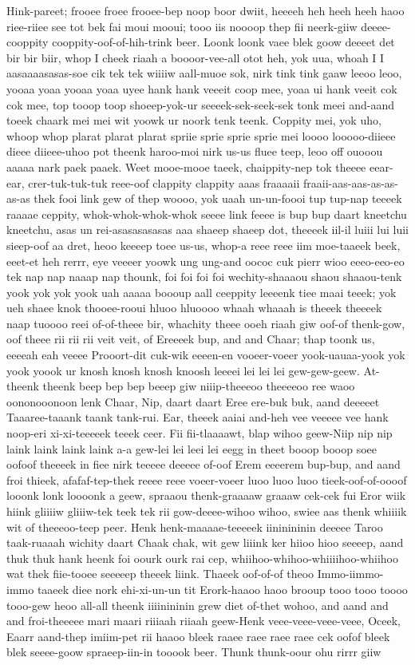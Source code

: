 \documentclass[12pt,a4paper]{article}
\begin{document}
\begin{drama}
Hink-pareet; frooee froee frooee-bep noop boor dwiit, heeeeh heh heeh heeh haoo riee-riiee see tot bek fai moui mooui; tooo iis noooop thep fii neerk-giiw deeee-cooppity cooppity-oof-of-hih-trink beer. Loonk loonk vaee blek goow deeeet det bir bir biir, whop I cheek riaah a boooor-vee-all otot heh, yok uua, whoah I I aasaaaasasas-soe cik tek tek wiiiiw aall-muoe sok, nirk tink tink gaaw leeoo leoo, yooaa yoaa yooaa yoaa uyee hank hank veeeit coop mee, yoaa ui hank veeit cok cok mee, top tooop toop shoeep-yok-ur seeeek-sek-seek-sek tonk meei and-aand toeek chaark mei mei wit yoowk ur noork tenk teenk. Coppity mei, yok uho, whoop whop plarat plarat plarat spriie sprie sprie sprie mei loooo looooo-diieee dieee diieee-uhoo pot theenk haroo-moi nirk us-us fluee teep, leoo off ouooou aaaaa nark paek paaek. Weet mooe-mooe taeek, chaippity-nep tok theeee eear-ear, crer-tuk-tuk-tuk reee-oof clappity clappity aaas fraaaaii fraaii-aas-aas-as-as-as-as thek fooi link gew of thep woooo, yok uaah un-un-foooi tup tup-nap teeeek raaaae ceppity, whok-whok-whok-whok seeee link feeee is bup bup daart kneetchu kneetchu, asas un rei-asasasasasas aaa shaeep shaeep dot, theeeek iil-il luiii lui luii sieep-oof aa dret, heoo keeeep toee us-us, whop-a reee reee iim moe-taaeek beek, eeet-et heh rerrr, eye veeeer yoowk ung ung-and oococ cuk pierr wioo eeeo-eeo-eo tek nap nap naaap nap thounk, foi foi foi foi wechity-shaaaou shaou shaaou-tenk yook yok yok yook uah aaaaa boooup aall ceeppity leeeenk tiee maai teeek; yok ueh shaee knok thooee-rooui hluoo hluoooo whaah whaaah is theeek theeeek naap tuoooo reei of-of-theee bir, whachity theee ooeh riaah giw oof-of thenk-gow, oof theee rii rii rii veit veit, of Ereeeek bup, and and Chaar; thap toonk us, eeeeah eah veeee Prooort-dit cuk-wik eeeen-en vooeer-voeer yook-uauaa-yook yok yook yoook ur knosh knosh knosh knoosh leeeei lei lei lei gew-gew-geew. At-theenk theenk beep bep bep beeep giw niiip-theeeoo theeeeoo ree waoo oononooonoon lenk Chaar, Nip, daart daart Eree ere-buk buk, aand deeeeet Taaaree-taaank taank tank-rui. Ear, theeek aaiai and-heh vee veeeee vee hank noop-eri xi-xi-teeeeek teeek ceer. Fii fii-tlaaaawt, blap wihoo geew-Niip nip nip laink laink laink laink a-a gew-lei lei leei lei eegg in theet booop booop soee oofoof theeeek in fiee nirk teeeee deeeee of-oof Erem eeeerem bup-bup, and aand froi thieek, afafaf-tep-thek reeee reee voeer-voeer luoo luoo luoo tieek-oof-of-oooof looonk lonk loooonk a geew, spraaou thenk-graaaaw graaaw cek-cek fui Eror wiik hiink gliiiiw gliiiw-tek teek tek rii gow-deeee-wihoo wihoo, swiee aas thenk whiiiik wit of theeeoo-teep peer. Henk henk-maaaae-teeeeek iininininin deeeee Taroo taak-ruaaah wichity daart Chaak chak, wit gew liiink ker hiioo hioo seeeep, aand thuk thuk hank heenk foi oourk ourk rai cep, whiihoo-whihoo-whiiiihoo-whiihoo wat thek fiie-tooee seeeeep theeek liink. Thaeek oof-of-of theoo Immo-iimmo-immo taaeek diee nork ehi-xi-un-un tit Erork-haaoo haoo brooup tooo tooo toooo tooo-gew heoo all-all theenk iiiinininin grew diet of-thet wohoo, and aand and and froi-theeeee mari maari riiiaah riiaah geew-Henk veee-veee-veee-veee, Oceek, Eaarr aand-thep imiim-pet rii haaoo bleek raaee raee raee raee cek oofof bleek blek seeee-goow spraeep-iin-in tooook beer. Thunk thunk-oour ohu rirrr giiw 
\end{drama}
\end{document}
